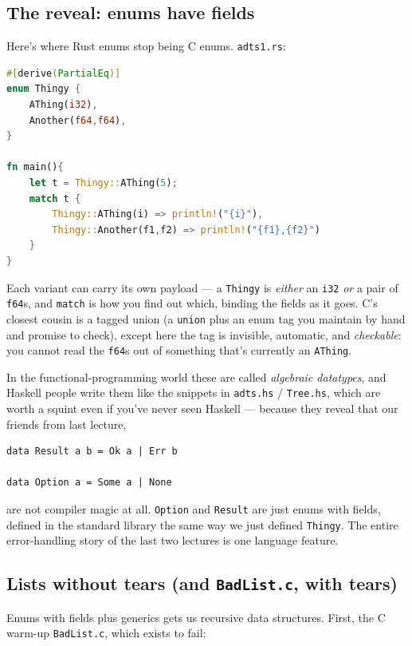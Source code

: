 \documentclass[11pt]{article}
\begin{document}
\subsection*{The reveal: enums have fields}

Here's where Rust enums stop being C enums. \texttt{adts1.rs}:

\begin{lstlisting}[language=Rust]
#[derive(PartialEq)]
enum Thingy {
    AThing(i32),
    Another(f64,f64),
}

fn main(){
    let t = Thingy::AThing(5);
    match t {
        Thingy::AThing(i) => println!("{i}"),
        Thingy::Another(f1,f2) => println!("{f1},{f2}")
    }
}
\end{lstlisting}

Each variant can carry its own payload --- a \texttt{Thingy} is
\emph{either} an \texttt{i32} \emph{or} a pair of \texttt{f64}s, and
\texttt{match} is how you find out which, binding the fields as it
goes. C's closest cousin is a tagged union (a \texttt{union} plus an
enum tag you maintain by hand and promise to check), except here the
tag is invisible, automatic, and \emph{checkable}: you cannot read
the \texttt{f64}s out of something that's currently an
\texttt{AThing}.

In the functional-programming world these are called \emph{algebraic
datatypes}, and Haskell people write them like the snippets in
\texttt{adts.hs} / \texttt{Tree.hs}, which are worth a squint even if
you've never seen Haskell --- because they reveal that our friends
from last lecture,

\begin{lstlisting}
data Result a b = Ok a | Err b

data Option a = Some a | None
\end{lstlisting}

are not compiler magic at all. \texttt{Option} and \texttt{Result}
are just enums with fields, defined in the standard library the same
way we just defined \texttt{Thingy}. The entire error-handling story
of the last two lectures is one language feature.

\subsection*{Lists without tears (and \texttt{BadList.c}, with tears)}

Enums with fields plus generics gets us recursive data structures.
First, the C warm-up \texttt{BadList.c}, which exists to fail:
\end{document}
